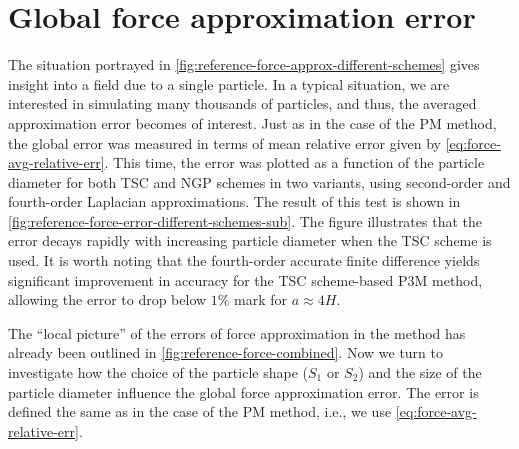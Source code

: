 \section{Global force approximation error}
The situation portrayed in \autoref{fig:reference-force-approx-different-schemes} gives insight into a field due to a single particle.
In a typical situation, we are interested in simulating many thousands of particles, and thus, the averaged approximation error becomes of interest.
Just as in the case of the PM method, the global error was measured in terms of mean relative error given by \autoref{eq:force-avg-relative-err}.
This time, the error was plotted as a function of the particle diameter for both TSC and NGP schemes in two variants, using second-order and fourth-order Laplacian approximations.
The result of this test is shown in \autoref{fig:reference-force-error-different-schemes-sub}.
The figure illustrates that the error decays rapidly with increasing particle diameter when the TSC scheme is used.
It is worth noting that the fourth-order accurate finite difference yields significant improvement in accuracy for the TSC scheme-based P3M method, allowing the error to drop below $1\%$ mark for $a \approx 4H$.

The ``local picture'' of the errors of force approximation in the \PThreeM{} method has already been outlined in \autoref{fig:reference-force-combined}.
Now we turn to investigate how the choice of the particle shape ($S_1$ or $S_2$) and the size of the particle diameter influence the global force approximation error.
The error is defined the same as in the case of the PM method, i.e., we use \autoref{eq:force-avg-relative-err}.

